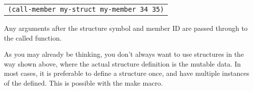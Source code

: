 \documentclass[
letterpaper,
oneside,
]{memoir}
\begin{document}
\vspace{1em}
\begin{tabular}{l}
  \texttt{(call-member my-struct my-member 34 35)} \\
\end{tabular}
\vspace{1em}

\noindent
Any arguments after the structure symbol and member ID are passed through to the called function.

\clearpage

As you may already be thinking, you don’t always want to use structures in the way shown above, where the actual structure definition is the mutable data. In most cases, it is preferable to define a structure once, and have multiple instances of the defined. This is possible with the make macro.
\end{document}
